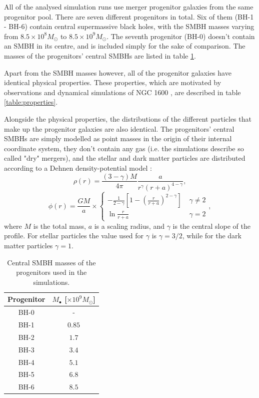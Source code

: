 \documentclass[english, oneside]{HYgradu}
\begin{document}
All of the analysed simulation runs use merger progenitor galaxies from the same progenitor pool. There are seven different progenitors in total. Six of them (BH-1 - BH-6) contain central supermassive black holes, with the SMBH masses varying from $8.5 \times 10^8 M_\odot$ to $8.5 \times 10^9 M_\odot$. The seventh progenitor (BH-0) doesn't contain an SMBH in its centre, and is included simply for the sake of comparison. The masses of the progenitors' central SMBHs are listed in table \ref{table:progenitors}. 

Apart from the SMBH masses however, all of the progenitor galaxies have identical physical properties. These properties, which are motivated by observations and dynamical simulations of NGC 1600 \citep{Rantala2018}, are described in table \ref{table:properties}.

Alongside the physical properties, the distributions of the different particles that make up the progenitor galaxies are also identical. The progenitors' central SMBHs are simply modelled as point masses in the origin of their internal coordinate system, they don't contain any gas (i.e. the simulations describe so called "dry" mergers), and the stellar and dark matter particles are distributed according to a Dehnen density-potential model \citep{Dehnen1993}:
\begin{equation}
\rho(r) = \frac{(3-\gamma)M}{4\pi} \frac{a}{r^\gamma (r+a)^{4-\gamma}},
\end{equation}
\begin{equation}
\phi(r) = \frac{GM}{a} \times 
\begin{cases}
	-\frac{1}{2-\gamma} \left[ 1 - \left( \frac{r}{r+a} \right)^{2-\gamma} \right] & \; \gamma \neq 2 \\
	\ln \frac{r}{r+a}	 & \; \gamma = 2
\end{cases},
\end{equation}
where $M$ is the total mass, $a$ is a scaling radius, and $\gamma$ is the central slope of the profile. For stellar particles the value used for $\gamma$  is $\gamma = 3/2$, while for the dark matter particles $\gamma = 1$.

\begin{table}
	\begin{center}
		\begin{tabular}{c c}
		\hline
		\hline
		Progenitor & $M_\bullet$ [$\times 10^9 M_\odot$] \\
		\hline
		BH-0 & - \\
		BH-1 & $0.85$ \\
		BH-2 & $1.7$ \\
		BH-3 & $3.4$ \\
		BH-4 & $5.1$ \\
		BH-5 & $6.8$ \\
		BH-6 & $8.5$ \\
		\hline
		\end{tabular}
	\end{center}
	\caption{Central SMBH masses of the progenitors used in the simulations.}
	\label{table:progenitors}
\end{table}
\end{document}
